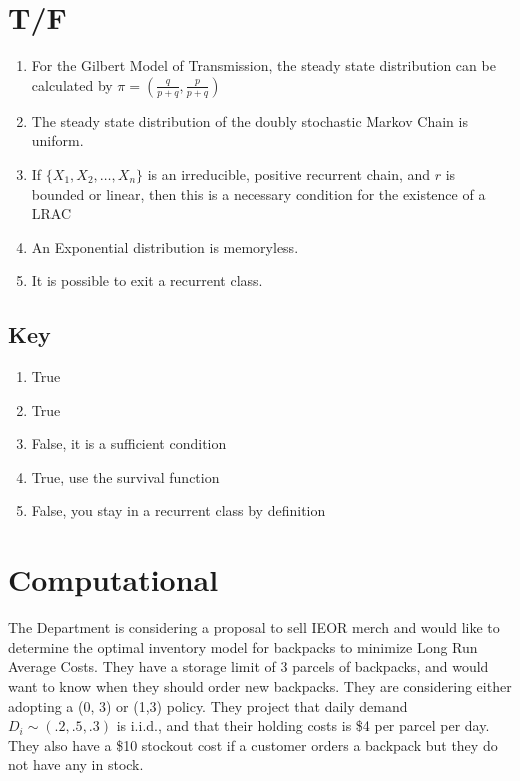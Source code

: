 \documentclass{report}
\title{}
\author{Ryan Lin}
\date{}
\begin{document}
\maketitle
\section*{T/F}

\begin{enumerate}
	\item For the Gilbert Model of Transmission, the steady state distribution can be calculated by $ \pi = (\frac{q}{p+q}, \frac{p}{p+q})  $
	\item The steady state distribution of the doubly stochastic Markov Chain is uniform. 
	\item If $ \{X_1, X_2, \dots, X_{n}\} $ is an irreducible, positive recurrent chain, and $ r $ is bounded or linear, then this is a necessary condition for the existence of a LRAC
	\item An Exponential distribution is memoryless. 
	\item It is possible to exit a recurrent class.
\end{enumerate}

\subsection*{Key}
\begin{enumerate}
	\item True
	\item True
	\item False, it is a sufficient condition
	\item True, use the survival function 
	\item False, you stay in a recurrent class by definition
\end{enumerate}

\section*{Computational}

The Department is considering a proposal to sell IEOR merch and would like to determine the optimal inventory model for backpacks to minimize Long Run Average Costs. They have a storage limit of 3 parcels of backpacks, and would want to know when they should order new backpacks. They are considering either adopting a (0, 3) or (1,3) policy. They project that daily demand $ D_{i} \sim (.2, .5, .3)$ is i.i.d., and that their holding costs is \$4 per parcel per day. They also have a \$10 stockout cost if a customer orders a backpack but they do not have any in stock.  
\end{document}

